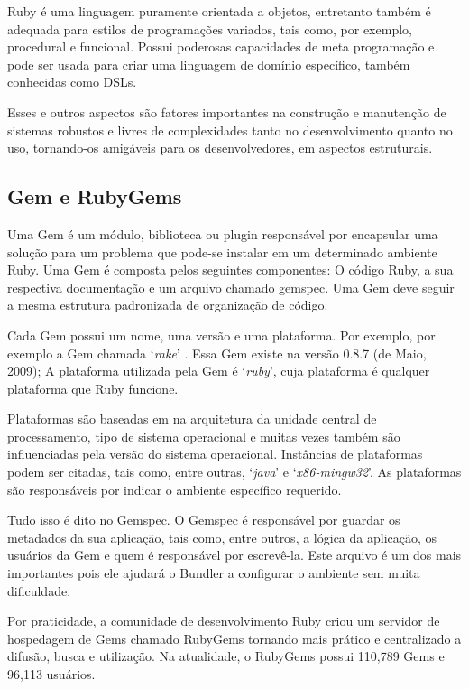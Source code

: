 Ruby é uma linguagem puramente orientada a objetos, entretanto também é adequada para estilos de programações variados, tais como, por exemplo, procedural e funcional. Possui poderosas capacidades de meta programação e pode ser usada para criar uma linguagem de domínio específico, também conhecidas como DSLs.

Esses e outros aspectos são fatores importantes na construção e manutenção de sistemas robustos e livres de complexidades tanto no desenvolvimento quanto no uso, tornando-os amigáveis para os desenvolvedores, em aspectos estruturais. \cite{flanagan2008ruby}

\subsection{Gem e RubyGems}

Uma Gem é um módulo, biblioteca ou plugin responsável por encapsular uma solução para um problema que pode-se instalar em um determinado ambiente Ruby. Uma Gem é composta pelos seguintes componentes: O código Ruby, a sua respectiva documentação e um arquivo chamado gemspec. Uma Gem deve seguir a mesma estrutura padronizada de organização de código.

Cada Gem possui um nome, uma versão e uma plataforma. Por exemplo, por exemplo a Gem chamada `\textit{rake}' \cite{rake2014}. Essa Gem existe na versão 0.8.7 (de Maio, 2009); A plataforma utilizada pela Gem é `\textit{ruby}', cuja plataforma é qualquer plataforma que Ruby funcione. \cite{berube2007practical}

Plataformas são baseadas em na arquitetura da unidade central de processamento, tipo de sistema operacional e muitas vezes também são influenciadas pela versão do sistema operacional. Instâncias de plataformas podem ser citadas, tais como, entre outras, `\textit{java}' e `\textit{x86-mingw32}'. As plataformas são responsáveis por indicar o ambiente específico requerido.

Tudo isso é dito no Gemspec. O Gemspec é responsável por guardar os metadados da sua aplicação, tais como, entre outros, a lógica da aplicação, os usuários da Gem e quem é responsável por escrevê-la. Este arquivo é um dos mais importantes pois ele ajudará o Bundler a configurar o ambiente sem muita dificuldade.

Por praticidade, a comunidade de desenvolvimento Ruby criou um servidor de hospedagem de Gems chamado RubyGems tornando mais prático e centralizado a difusão, busca e utilização. Na atualidade, o RubyGems possui 110,789 Gems e 96,113 usuários.
